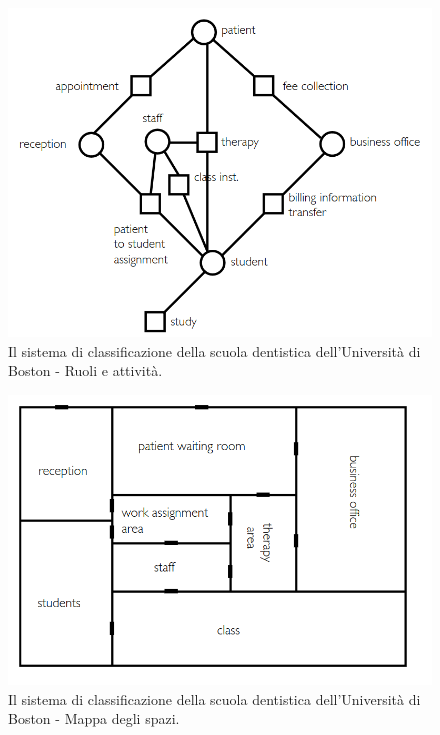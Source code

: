 \begin{figure}[h]
    \centering
    \includegraphics[scale=0.5]{images/UniBoston.png}
    \caption{Il sistema di classificazione della scuola dentistica dell'Università di Boston - Ruoli e attività.}
\end{figure}

\begin{figure}
    \centering
    \includegraphics[scale=0.4]{images/UniBoston2.png}
    \caption{Il sistema di classificazione della scuola dentistica dell'Università di Boston - Mappa degli spazi.}
\end{figure}


